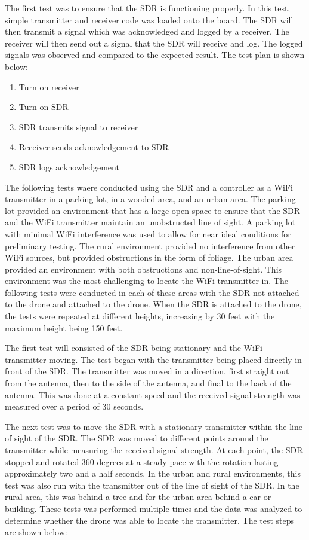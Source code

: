 The first test was to ensure that the SDR is functioning properly. In this test, simple transmitter and receiver code was loaded onto the board. The SDR will then transmit a signal which was acknowledged and logged by a receiver. The receiver will then send out a signal that the SDR will receive and log. The logged signals was observed and compared to the expected result. The test plan is shown below:

\begin{enumerate}
   \item Turn on receiver
   \item Turn on SDR
   \item SDR transmits signal to receiver
   \item Receiver sends acknowledgement to SDR
   \item SDR logs acknowledgement
\end{enumerate}\par 

The following tests waere conducted using the SDR and a controller as a WiFi transmitter in a parking lot, in a wooded area, and an urban area. The parking lot provided an environment that has a large open space to ensure that the SDR and the WiFi transmitter maintain an unobstructed line of sight. A parking lot with minimal WiFi interference was used to allow for near ideal conditions for preliminary testing. The rural environment provided no interference from other WiFi sources, but provided obstructions in the form of foliage. The urban area provided an environment with both obstructions and non-line-of-sight. This environment was the most challenging to locate the WiFi transmitter in. The following tests were conducted in each of these areas with the SDR not attached to the drone and attached to the drone. When the SDR is attached to the drone, the tests were repeated at different heights, increasing by 30 feet with the maximum height being 150 feet.\par 
The first test will consisted of the SDR being stationary and the WiFi transmitter moving. The test began with the transmitter being placed directly in front of the SDR. The transmitter was moved in a direction, first straight out from the antenna, then to the side of the antenna, and final to the back of the antenna. This was done at a constant speed and the received signal strength was measured over a period of 30 seconds.\par 
The next test was to move the SDR with a stationary transmitter within the line of sight of the SDR. The SDR was moved to different points around the transmitter while measuring the received signal strength. At each point, the SDR stopped and rotated 360 degrees at a steady pace with the rotation lasting approximately two and a half seconds. In the urban and rural environments, this test was also run with the transmitter out of the line of sight of the SDR. In the rural area, this was behind a tree and for the urban area behind a car or building. These tests was performed multiple times and the data was analyzed to determine whether the drone was able to locate the transmitter. The test steps are shown below: \par 

